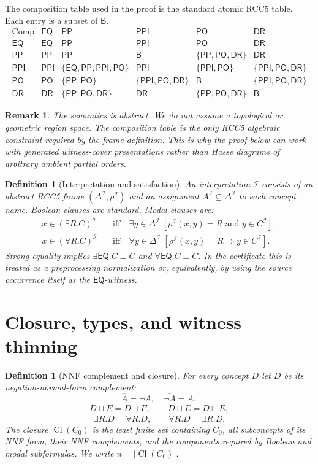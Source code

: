\documentclass[11pt]{article}
\newtheorem{definition}[theorem]{Definition}
\newtheorem{remark}[theorem]{Remark}
\newcommand{\Cl}{\operatorname{Cl}}
\newcommand{\Base}{\mathsf B}
\newcommand{\EQ}{\mathsf{EQ}}
\newcommand{\PP}{\mathsf{PP}}
\newcommand{\PPI}{\mathsf{PPI}}
\newcommand{\PO}{\mathsf{PO}}
\newcommand{\DR}{\mathsf{DR}}
\newcommand{\comp}{\operatorname{Comp}}
\newcommand{\I}{\mathcal I}
\begin{document}
The composition table used in the proof is the standard atomic RCC5 table.  Each entry is a subset of \(\Base\).
\[
\begin{array}{c|ccccc}
\comp & \EQ & \PP & \PPI & \PO & \DR \\
\hline
\EQ & \EQ & \PP & \PPI & \PO & \DR \\
\PP & \PP & \PP & \Base & \{\PP,\PO,\DR\} & \DR \\
\PPI & \PPI & \{\EQ,\PP,\PPI,\PO\} & \PPI & \{\PPI,\PO\} & \{\PPI,\PO,\DR\} \\
\PO & \PO & \{\PP,\PO\} & \{\PPI,\PO,\DR\} & \Base & \{\PPI,\PO,\DR\} \\
\DR & \DR & \{\PP,\PO,\DR\} & \DR & \{\PP,\PO,\DR\} & \Base
\end{array}
\]

\begin{remark}
The semantics is abstract.  We do not assume a topological or geometric region space.  The composition table is the only RCC5 algebraic constraint required by the frame definition.  This is why the proof below can work with generated witness-cover presentations rather than Hasse diagrams of arbitrary ambient partial orders.
\end{remark}

\begin{definition}[Interpretation and satisfaction]
An interpretation \(\I\) consists of an abstract RCC5 frame \((\Delta^\I,\rho^\I)\) and an assignment \(A^\I\subseteq\Delta^\I\) to each concept name.  Boolean clauses are standard.  Modal clauses are:
\[
\begin{aligned}
  x\in(\exists R.C)^\I &\quad\text{iff}\quad \exists y\in\Delta^\I\;[\rho^\I(x,y)=R\text{ and }y\in C^\I],\\
  x\in(\forall R.C)^\I &\quad\text{iff}\quad \forall y\in\Delta^\I\;[\rho^\I(x,y)=R\Rightarrow y\in C^\I].
\end{aligned}
\]
Strong equality implies \(\exists\EQ.C\equiv C\) and \(\forall\EQ.C\equiv C\).  In the certificate this is treated as a preprocessing normalization or, equivalently, by using the source occurrence itself as the \(\EQ\)-witness.
\end{definition}

\section{Closure, types, and witness thinning}

\begin{definition}[NNF complement and closure]
For every concept \(D\) let \(\overline D\) be its negation-normal-form complement:
\[
\overline{A}=\neg A,\quad \overline{\neg A}=A,
\]
\[
\overline{D\sqcap E}=\overline D\sqcup\overline E,
\qquad
\overline{D\sqcup E}=\overline D\sqcap\overline E,
\]
\[
\overline{\exists R.D}=\forall R.\overline D,
\qquad
\overline{\forall R.D}=\exists R.\overline D.
\]
The closure \(\Cl(C_0)\) is the least finite set containing \(C_0\), all subconcepts of its NNF form, their NNF complements, and the components required by Boolean and modal subformulas.  We write \(n=|\Cl(C_0)|\).
\end{definition}
\end{document}
